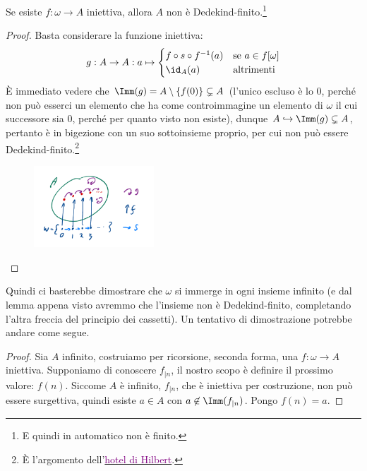 \begin{remark}
	\label{omega_Dedekind_finito}
	Se esiste $f : \omega \rightarrow A$ iniettiva, allora $A$ non è Dedekind-finito.\footnote{E quindi in automatico non è finito.}
\end{remark}

\begin{proof}
	Basta considerare la funzione iniettiva:
	\[ g : A \to A : a \mapsto \begin{cases}
		f \circ s \circ f^{-1}(a) &\text{se $a \in f[\omega]$} \\
		\id_A(a) &\text{altrimenti}
	\end{cases}
		\]
	È immediato vedere che $\Imm(g) = A \setminus \{f(0)\} \subsetneq A$ (l'unico escluso è lo 0, perché non può esserci un elemento che ha come controimmagine un elemento di $\omega$ il cui
	successore sia 0, perché per quanto visto non esiste), dunque $A \hookrightarrow \Imm(g) \subsetneq A$, pertanto è in bigezione con un suo sottoinsieme proprio, per cui non può essere Dedekind-finito.\footnote{È l'argomento dell'\href{https://en.wikipedia.org/wiki/Hilbert\%27s_paradox_of_the_Grand_Hotel}{\textcolor{purple}{hotel di Hilbert}}.}
	\begin{figure}[H]
		\centering
		\includegraphics[width = 4.5cm]{immagini/cassetti3.png}
	\end{figure}
\end{proof}

Quindi ci basterebbe dimostrare che $\omega$ si immerge in ogni insieme infinito (e dal lemma appena visto avremmo che l'insieme non è Dedekind-finito, completando l'altra freccia del principio dei cassetti).
Un tentativo di dimostrazione potrebbe andare come segue.

\begin{proof}
	Sia $A$ infinito, costruiamo per ricorsione, seconda forma, una $f : \omega \rightarrow A$ iniettiva. Supponiamo di conoscere $f_{|n}$, il nostro scopo è definire il prossimo valore: $f(n)$.
	Siccome $A$ è infinito, $f_{|n}$, che è iniettiva per costruzione, non può essere surgettiva, quindi esiste $a \in A$ con $a \not \in \Imm(f_{|n})$. Pongo $f(n) = a$.
\end{proof}

